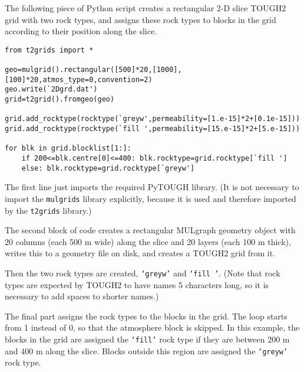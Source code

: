 The following piece of Python script creates a rectangular 2-D slice TOUGH2 grid with two rock types, and assigns these rock types to blocks in the grid according to their position along the slice.

\begin{verbatim}
from t2grids import *

geo=mulgrid().rectangular([500]*20,[1000],[100]*20,atmos_type=0,convention=2)
geo.write(`2Dgrd.dat')
grid=t2grid().fromgeo(geo)

grid.add_rocktype(rocktype(`greyw',permeability=[1.e-15]*2+[0.1e-15]))
grid.add_rocktype(rocktype(`fill ',permeability=[15.e-15]*2+[5.e-15]))

for blk in grid.blocklist[1:]:
    if 200<=blk.centre[0]<=400: blk.rocktype=grid.rocktype[`fill ']
    else: blk.rocktype=grid.rocktype[`greyw']
\end{verbatim}

The first line just imports the required PyTOUGH library.  (It is not necessary to import the \texttt{mulgrids} library explicitly, because it is used and therefore imported by the \texttt{t2grids} library.)

The second block of code creates a rectangular MULgraph geometry object with 20 columns (each 500 m wide) along the slice and 20 layers (each 100 m thick), writes this to a geometry file on disk, and creates a TOUGH2 grid from it.

Then the two rock types are created, \texttt{`greyw'} and \texttt{`fill '}.  (Note that rock types are expected by TOUGH2 to have names 5 characters long, so it is necessary to add spaces to shorter names.)

The final part assigns the rock types to the blocks in the grid.  The loop starts from 1 instead of 0, so that the atmosphere block is skipped.  In this example, the blocks in the grid are assigned the \texttt{`fill'} rock type if they are between 200 m and 400 m along the slice.  Blocks outside this region are assigned the \texttt{`greyw'} rock type.
